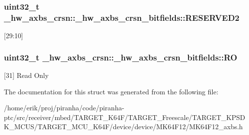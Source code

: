 \subsubsection[{\texorpdfstring{R\+E\+S\+E\+R\+V\+E\+D2}{RESERVED2}}]{\setlength{\rightskip}{0pt plus 5cm}uint32\+\_\+t \+\_\+hw\+\_\+axbs\+\_\+crsn\+::\+\_\+hw\+\_\+axbs\+\_\+crsn\+\_\+bitfields\+::\+R\+E\+S\+E\+R\+V\+E\+D2}\hypertarget{struct__hw__axbs__crsn_1_1__hw__axbs__crsn__bitfields_ab54cfd57fc77477f37f27ca82cb3a0d3}{}\label{struct__hw__axbs__crsn_1_1__hw__axbs__crsn__bitfields_ab54cfd57fc77477f37f27ca82cb3a0d3}
\mbox{[}29\+:10\mbox{]} 
\subsubsection[{\texorpdfstring{RO}{RO}}]{\setlength{\rightskip}{0pt plus 5cm}uint32\+\_\+t \+\_\+hw\+\_\+axbs\+\_\+crsn\+::\+\_\+hw\+\_\+axbs\+\_\+crsn\+\_\+bitfields\+::\+RO}\hypertarget{struct__hw__axbs__crsn_1_1__hw__axbs__crsn__bitfields_acce040240dfba45774eef414c23adb99}{}\label{struct__hw__axbs__crsn_1_1__hw__axbs__crsn__bitfields_acce040240dfba45774eef414c23adb99}
\mbox{[}31\mbox{]} Read Only 

The documentation for this struct was generated from the following file\+:\begin{DoxyCompactItemize}
\item 
/home/erik/proj/piranha/code/piranha-\/ptc/src/receiver/mbed/\+T\+A\+R\+G\+E\+T\+\_\+\+K64\+F/\+T\+A\+R\+G\+E\+T\+\_\+\+Freescale/\+T\+A\+R\+G\+E\+T\+\_\+\+K\+P\+S\+D\+K\+\_\+\+M\+C\+U\+S/\+T\+A\+R\+G\+E\+T\+\_\+\+M\+C\+U\+\_\+\+K64\+F/device/device/\+M\+K64\+F12/M\+K64\+F12\+\_\+axbs.\+h\end{DoxyCompactItemize}
